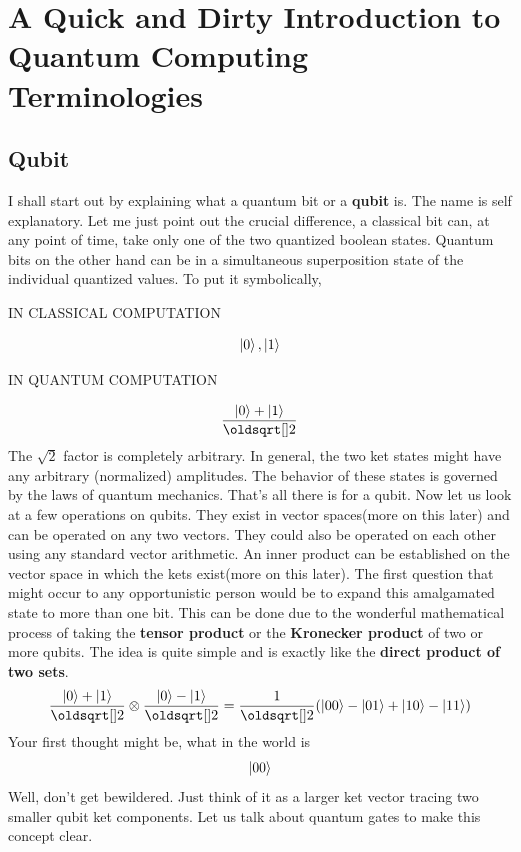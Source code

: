 \documentclass[12pt]{article}
\begin{document}
\section{A Quick and Dirty Introduction to Quantum Computing Terminologies}
\subsection{Qubit}
I shall start out by explaining what a quantum bit or a \textbf{qubit} is. The name is self explanatory. Let me just point out the crucial difference, a classical bit can, at any point of time, take only one of the two quantized boolean states. Quantum bits on the other hand can be in a simultaneous superposition state of the individual quantized values. To put it symbolically,
\begin{center}
IN CLASSICAL COMPUTATION
\end{center}
$$\Ket{0}, \Ket{1}$$
\begin{center}
IN QUANTUM COMPUTATION
\end{center}
$$\frac{\Ket{0}+\Ket{1}}{\sqrt{2}}$$
 The $\sqrt{2}$ factor is completely arbitrary. In general, the two ket states might have any arbitrary (normalized) amplitudes. The behavior of these states is governed by the laws of quantum mechanics. That's all there is for a qubit. Now let us look at a few operations on qubits. They exist in vector spaces(more on this later) and can be operated on any two vectors. They could also be operated on each other using any standard vector arithmetic. An inner product can be established on the vector space in which the kets exist(more on this later).  The first question that might occur to any opportunistic person would be to expand this amalgamated state to more than one bit. This can be done due to the wonderful mathematical process of taking the \textbf{tensor product} or the \textbf{Kronecker product} of two or more qubits. The idea is quite simple and is exactly like the \textbf{direct product of two sets}. 
$$\frac{\Ket{0}+\Ket{1}}{\sqrt{2}}\otimes\frac{\Ket{0}-\Ket{1}}{\sqrt{2}} = \frac{1}{\sqrt{2}}(\Ket{00}-\Ket{01}+\Ket{10}-\Ket{11})$$
Your first thought might be, what in the world is $$\Ket{00}$$Well, don't get bewildered. Just think of it as a larger ket vector tracing two smaller qubit ket components. Let us talk about quantum gates to make this concept clear. 
\end{document}
